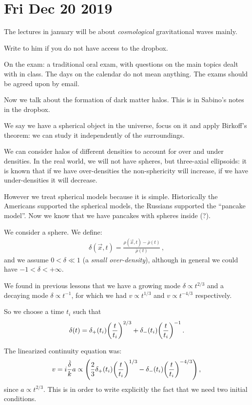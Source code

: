 \documentclass[main.tex]{subfiles}
\begin{document}
\section*{Fri Dec 20 2019}

The lectures in january will be about \emph{cosmological} gravitational waves mainly. 

Write to him if you do not have access to the dropbox. 

On the exam: a traditional oral exam, with questions on the main topics dealt with in class. 
The days on the calendar do not mean anything. 
The exams should be agreed upon by email. 

Now we talk about the formation of dark matter halos. 
This is in Sabino's notes in the dropbox. 

We say we have a spherical object in the universe, focus on it and apply Birkoff's theorem: we can study it independently of the surroundings. 

We can consider halos of different densities to account for over and under densities. 
In the real world, we will not have spheres, but three-axial ellipsoids: it is known that if we have over-densities the non-sphericity will increase, if we have under-densities it will decrease. 

However we treat spherical models because it is simple.
Historically the Americans supported the spherical models, the Russians supported the ``pancake model''. 
Now we know that we have pancakes with spheres inside (?). 

We consider a sphere. We define: 
%
\begin{align}
\delta (\vec{x}, t) = \frac{\rho (\vec{x}, t) - \overline{\rho}(t)}{\overline{\rho}(t)} 
\,,
\end{align}
%
and we assume \(0<\delta \ll 1\) (a \emph{small over-density}), although in general we could have \(-1 < \delta < + \infty \). 

We found in previous lessons that we have a growing mode \(\delta \propto t^{2/3}\) and a decaying mode \(\delta \propto t^{-1}\), for which we had \(v \propto t^{1/3} \) and \(v \propto t^{-4/3}\) respectively. 

So we choose a time \(t_i\) such that 
%
\begin{align}
\delta (t) = \delta_+ (t_i) \qty(\frac{t}{t_i})^{2/3}
+ \delta_- (t_i) \qty(\frac{t}{t_i})^{-1}
\,.
\end{align}

The linearized continuity equation was: 
%
\begin{align}
v = i \frac{ \dot{\delta}}{k} a 
\propto \qty(\frac{2}{3} \delta_{+} (t_i) \qty(\frac{t}{t_i})^{1/3} - \delta_{-} (t_i) \qty(\frac{t}{t_i})^{-4/3})
\,,
\end{align}
%
since \(a \propto t^{2/3}\). This is in order to write explicitly the fact that we need two initial conditions. 
\end{document}
